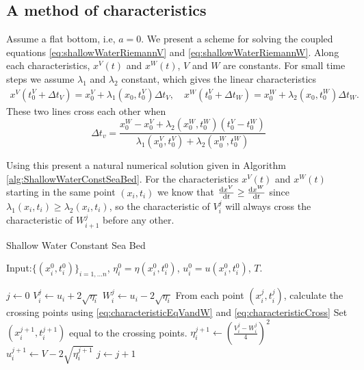 \documentclass[11pt]{article}
\begin{document}
\subsection{A method of characteristics}
Assume a flat bottom, i.e, $a = 0$. We present a scheme for solving the coupled equations \eqref{eq:shallowWaterRiemannV} and \eqref{eq:shallowWaterRiemannW}. Along each characteristics, $x^V(t)$ and $x^W(t)$, $V$ and $W$ are constants. For small time steps we assume $\lambda_1$ and $\lambda_2$ constant, which gives the linear characteristics
\begin{align}
	\label{eq:characteristicEqVandW}
	x^V(t^V_0+\Delta t_V) = x^V_0 + \lambda_1(x_0,t^V_0)\Delta t_V ,\quad x^W(t^V_0+\Delta t_W) = x^W_0 + \lambda_2(x_0,t_0^W)\Delta t_W.
\end{align}
These two lines cross each other when 
\begin{equation}
	\label{eq:characteristicCross}
	\Delta t_v = \frac{x_0^W - x_0^V + \lambda_2(x_0^W,t_0^W)(t_0^V - t_0^W)}{\lambda_1(x_0^V,t_0^V)+\lambda_2(x_0^W,t_0^W)}
\end{equation}

Using this present a natural numerical solution given in  Algorithm \ref{alg:ShallowWaterConstSeaBed}.  
For the characteristics $x^V(t)$ and $x^W(t)$ starting in the same point $(x_i,t_i)$ we know that $\frac{\operatorname{d}\! x^V}{\operatorname{d}\! t}\geq \frac{\operatorname{d}\! x^W}{\operatorname{d}\! t}$ since $\lambda_1(x_i,t_i)\geq \lambda_2(x_i,t_i)$, so the characteristic of $V_i^j$ will always cross the characteristic of $W_{i+1}^j$ before any other. 
\begin{algorithm}
	\caption{Shallow Water Constant Sea Bed}
	\begin{algorithmic}[1]
		\State    Input:$\{(x^0_i,t^0_i)\}_{i=1,\ldots n}$, $\eta^0_i=\eta(x^0_i,t^0_i)$, $u^0_i = u(x_i^0,t^0_i)$,  $T$.

		\State $j\leftarrow 0$
		\State $V^j_i \leftarrow u_i + 2\sqrt{\eta_i}$
		\State $W^j_i \leftarrow u_i - 2\sqrt{\eta_i}$
		\State From each point $(x^j_i,t^j_i)$, calculate the crossing points using 		
		\eqref{eq:characteristicEqVandW} and \eqref{eq:characteristicCross}
		\State Set $(x^{j+1}_i,t^{j+1}_i)$ equal to the crossing points.
		\State $\eta_i^{j+1} \leftarrow \left(\frac{V_i^j -W_i^j}{4}\right)^2$
		\State $u_i^{j+1} \leftarrow V - 2\sqrt{\eta_i^{j+1}}$
		\State $j\leftarrow j + 1$
		\EndWhile
	\end{algorithmic}
	\label{alg:ShallowWaterConstSeaBed}
\end{algorithm}
%
%
\end{document}
